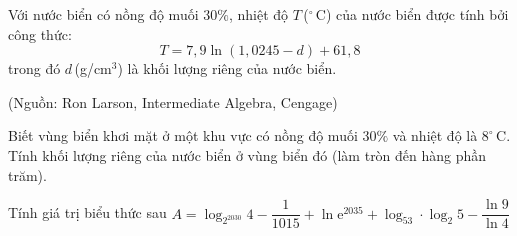 \begin{ex}%
	Với nước biển có nồng độ muối $30\%$, nhiệt độ $T$\,($^{\circ}$\,C) của nước biển được tính bởi công thức:  
	\[T = 7{,}9 \ln(1{,}0245 - d) + 61{,}8\]
	trong đó $d$\,(g/cm$^3$) là khối lượng riêng của nước biển.  
	\begin{flushright}
		(Nguồn: Ron Larson, Intermediate Algebra, Cengage)  
	\end{flushright}
	Biết vùng biển khơi mặt ở một khu vực có nồng độ muối $30\%$ và nhiệt độ là $8^{\circ}\,\mathrm{C}$. Tính khối lượng riêng của nước biển ở vùng biển đó (làm tròn đến hàng phần trăm).
\end{ex}

\begin{ex}%
Tính giá trị biểu thức sau $A=\log_{2^{2030}}4-\dfrac{1}{1015}+\ln{\mathrm{e}^{2035}}+\log_53\cdot{\log_2}5-\dfrac{\ln 9}{\ln 4}$
\end{ex}

